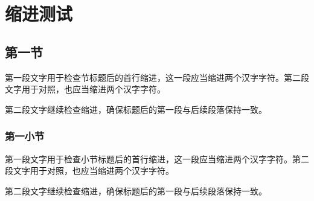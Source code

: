 \documentclass[fontset=fandol]{qznu-thesis}
\begin{document}
\qznumainmatter

\chapter{缩进测试}
\section{第一节}
第一段文字用于检查节标题后的首行缩进，这一段应当缩进两个汉字字符。第二段文字用于对照，也应当缩进两个汉字字符。

第二段文字继续检查缩进，确保标题后的第一段与后续段落保持一致。

\subsection{第一小节}
第一段文字用于检查小节标题后的首行缩进，这一段应当缩进两个汉字字符。第二段文字用于对照，也应当缩进两个汉字字符。

第二段文字继续检查缩进，确保标题后的第一段与后续段落保持一致。
\end{document}
